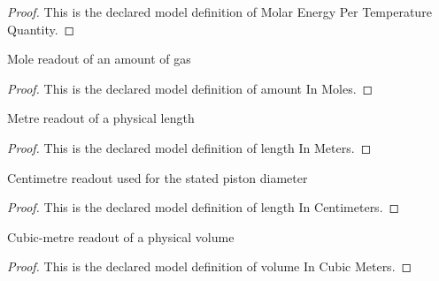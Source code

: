\begin{proof}
  This is the declared model definition of Molar Energy Per Temperature Quantity.
\end{proof}
\begin{definition}
  \label{def:physics:phyx-mini-0436:phyxminiproblems-problemphyxmini0436-amountinmoles}
  Mole readout of an amount of gas
\end{definition}
\begin{proof}
  This is the declared model definition of amount In Moles.
\end{proof}
\begin{definition}
  \label{def:physics:phyx-mini-0436:phyxminiproblems-problemphyxmini0436-lengthinmeters}
  Metre readout of a physical length
\end{definition}
\begin{proof}
  This is the declared model definition of length In Meters.
\end{proof}
\begin{definition}
  \label{def:physics:phyx-mini-0436:phyxminiproblems-problemphyxmini0436-lengthincentimeters}
  Centimetre readout used for the stated piston diameter
\end{definition}
\begin{proof}
  This is the declared model definition of length In Centimeters.
\end{proof}
\begin{definition}
  \label{def:physics:phyx-mini-0436:phyxminiproblems-problemphyxmini0436-volumeincubicmeters}
  Cubic-metre readout of a physical volume
\end{definition}
\begin{proof}
  This is the declared model definition of volume In Cubic Meters.
\end{proof}
